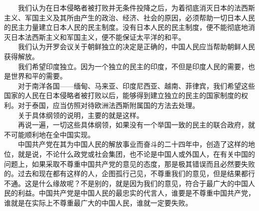 \documentclass[cn,11pt,chinese]{elegantbook}
\begin{document}
　　我们认为在日本侵略者被打败并无条件投降之后，为着彻底消灭日本的法西斯主义、军国主义及其所由产生的政治、经济、社会的原因，必须帮助一切日本人民的民主力量建立日本人民的民主制度。没有日本人民的民主制度，便不能彻底地消灭日本法西斯主义和军国主义，便不能保证太平洋的和平。\\
　　我们认为开罗会议关于朝鲜独立的决定是正确的，中国人民应当帮助朝鲜人民获得解放。\\
　　我们希望印度独立。因为一个独立的民主的印度，不但是印度人民的需要，也是世界和平的需要。\\
　　对于南洋各国——缅甸、马来亚、印度尼西亚、越南、菲律宾，我们希望这些国家的人民在日本侵略者被打败以后，能够得到建立独立的民主的国家制度的权利。对于泰国，应当仿照对待欧洲法西斯附属国的方法去处理。\\
　　关于具体纲领的说明，主要的就是这样。\\
　　再说一遍，一切这些具体纲领，如果没有一个举国一致的民主的联合政府，就不可能顺利地在全中国实现。\\
　　中国共产党在其为中国人民的解放事业而奋斗的二十四年中，创造了这样的地位，就是说，不论什么政党或社会集团，也不论是中国人或外国人，在有关中国的问题上，如果采取不尊重中国共产党的意见的态度，那是极其错误而且必然要失败的。过去和现在都有这样的人，企图孤行己见，不尊重我们的意见，但是结果都行不通。这是什么缘故呢？不是别的，就是因为我们的意见，符合于最广大的中国人民的利益。中国共产党是中国人民的最忠实的代言人，谁要是不尊重中国共产党，谁就是在实际上不尊重最广大的中国人民，谁就一定要失败。\\
\end{document}
